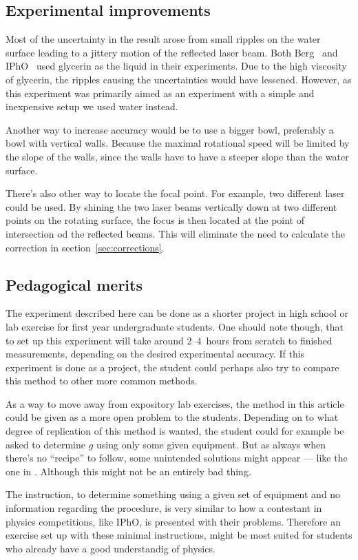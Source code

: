 \documentclass[11pt,
a4paper, 
swedish, english]{article}
\begin{document}
\subsection{Experimental improvements}
Most of the uncertainty in the result arose from small ripples on the
water surface leading to a jittery motion of the reflected
laser beam. Both Berg~\cite{Berg1990} and IPhO~\cite{IPhO2001} used
glycerin as the liquid in their experiments. Due to the high viscosity
of glycerin, the ripples causing the uncertainties would have lessened.
However, as this experiment was primarily aimed as an experiment with a
simple and inexpensive setup we used water instead.  

Another way to increase accuracy would be to use a bigger bowl,
preferably a bowl with vertical walls. Because the maximal rotational
speed will be limited by the slope of the walls, since the walls have
to have a steeper slope than the water surface.

There's also other way to locate the focal point. For example, two
different laser could be used. By shining the two laser beams
vertically down at two different points on the rotating surface, the
focus is then located at the point of intersection od the reflected
beams. This will eliminate the need to calculate the correction in
section~\ref{sec:corrections}. 

\subsection{Pedagogical merits}
The experiment described here can be done as a shorter project in high
school or lab exercise for first year undergraduate students. One
should note though, that to set up this experiment will take around
2--4~hours from scratch to finished measurements, depending on the
desired experimental accuracy. If this experiment is done as a
project, the student could perhaps also try to compare this method to
other more common methods.

As a way to move away from expository lab exercises, the method in
this article could be given as a more open problem to the
students. Depending on to what degree of replication of this method
is wanted, the student could for example be asked to determine $g$
using only some given equipment. But as always when there's no
``recipe'' to follow, some unintended solutions might appear --- like
the one in \cite{IPhO2001}. Although this might not be an entirely bad
thing. 

The instruction, to determine something using a given set of
equipment and no information regarding the procedure, is very similar
to how a contestant in physics competitions, like IPhO, is presented
with their problems. Therefore an exercise set up with these minimal
instructions, might be most suited for students who already have a
good understandig of physics. 
\end{document}
